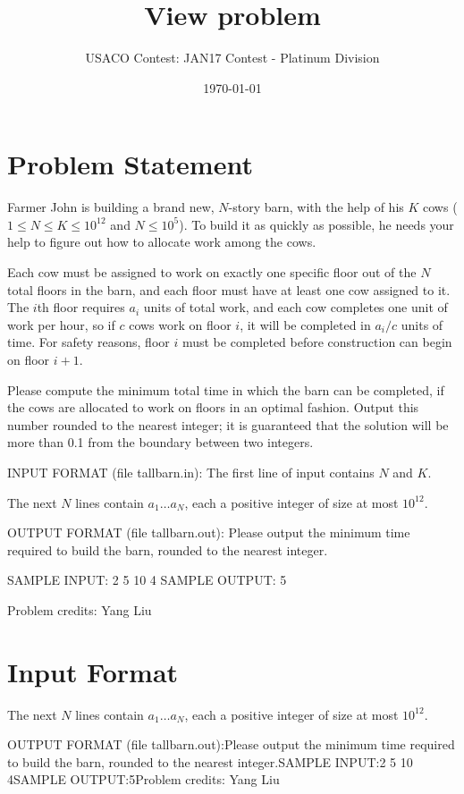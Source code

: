 \documentclass[12pt]{article}
\title{View problem}
\author{USACO Contest: JAN17 Contest - Platinum Division}
\date{\today}
\begin{document}
\maketitle

\section*{Problem Statement}

Farmer John is building a brand new, $N$-story barn, with the help of his  $K$
cows ($1 \leq N \leq K \leq 10^{12}$ and $N \leq 10^5$).  To build it as quickly
as possible, he needs your help to figure out how to allocate work among the
cows.

Each cow must be assigned to work on exactly one specific floor out of the $N$
total floors in the barn, and each floor must have at least one cow assigned to
it.  The $i$th floor requires $a_i$ units of total work, and each cow completes
one unit of work per hour, so if $c$ cows work on floor $i$, it will be
completed in $a_i / c$ units of time. For safety reasons, floor $i$ must be
completed before construction can begin on floor $i+1$.  

Please compute the minimum total time in which the barn can be completed, if the
cows are allocated to work on floors in an optimal fashion.  Output this number
rounded to the nearest integer; it is guaranteed that the solution will be more
than 0.1 from the boundary between two integers.

INPUT FORMAT (file tallbarn.in):
The first line of input contains $N$ and $K$.

The next $N$ lines contain $a_1 \ldots a_N$, each a positive integer of size at
most $10^{12}$.

OUTPUT FORMAT (file tallbarn.out):
Please output the minimum time required to build the barn, rounded to the
nearest integer.

SAMPLE INPUT:
2 5
10
4
SAMPLE OUTPUT: 
5


Problem credits: Yang Liu



\section*{Input Format}
The next $N$ lines contain $a_1 \ldots a_N$, each a positive integer of size at
most $10^{12}$.

OUTPUT FORMAT (file tallbarn.out):Please output the minimum time required to build the barn, rounded to the
nearest integer.SAMPLE INPUT:2 5
10
4SAMPLE OUTPUT:5Problem credits: Yang Liu
\end{document}
